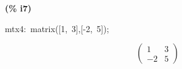 \documentclass[fleqn]{article}
\begin{document}
\noindent
\begin{minipage}[t]{4.000000em}\color{red}\bfseries
(\% i7)	
\end{minipage}
\begin{minipage}[t]{\textwidth}\color{blue}
mtx4:\ matrix([1,\ 3],[-2,\ 5]);
\end{minipage}
\[\displaystyle \tag{mtx4} 
\begin{pmatrix}1 & 3\\
\mathop{-}2 & 5\end{pmatrix}\mbox{}
\]
\end{document}
